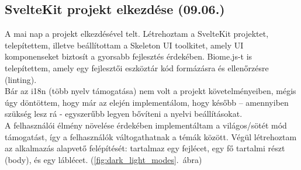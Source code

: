 \documentclass[a4paper]{article}
\begin{document}
\subsection{SvelteKit projekt elkezdése (09.06.)}

A mai nap a projekt elkezdésével telt. Létrehoztam a SvelteKit projektet, telepítettem, illetve
beállítottam a Skeleton UI toolkitet, amely UI komponenseket biztosít a gyorsabb fejlesztés
érdekében. Biome.js-t is telepítettem, amely egy fejlesztői eszköztár kód formázásra és ellenőrzésre
(linting).\\

Bár az i18n (több nyelv támogatása) nem volt a projekt követelményeiben, mégis úgy döntöttem, hogy
már az elején implementálom, hogy később – amennyiben szükség lesz rá - egyszerűbb legyen bővíteni
a nyelvi beállításokat.\\

A felhasználói élmény növelése érdekében implementáltam a világos/sötét mód támogatást, így a
felhasználók váltogathatnak a témák között. Végül létrehoztam az alkalmazás alapvető felépítését:
tartalmaz egy fejlécet, egy fő tartalmi részt (body), és egy láblécet. (\ref{fig:dark_light_modes}.~ábra)\\
\end{document}
